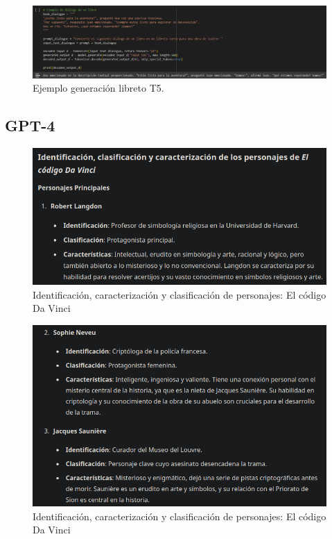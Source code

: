 \documentclass[journal,onecolumn]{IEEEtran}
\begin{document}
	\begin{figure}[H]
		\centering
		\includegraphics[scale=0.5]{t5test2}
		\caption{Ejemplo generación libreto T5.}
		\small
	\end{figure}
	
	
	\subsection{GPT-4}
	\begin{figure}[H]
		\centering
		\includegraphics[scale=0.5]{gpt4_1}
		\caption{Identificación, caracterización y clasificación de personajes: El código Da Vinci}
		\small
	\end{figure}
	\begin{figure}[H]
		\centering
		\includegraphics[scale=0.5]{gpt4_2}
		\caption{Identificación, caracterización y clasificación de personajes: El código Da Vinci}
		\small
	\end{figure}
\end{document}
